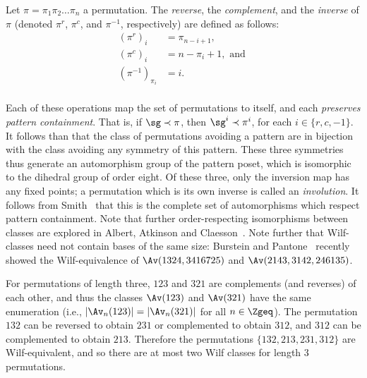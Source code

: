 \documentclass[12pt,twoside]{memoir}
\begin{document}
      \begin{definition} \label{prelim:def:symmetries}
        Let $\pi = \pi_1 \pi_2 \dots \pi_n$ a permutation. The
        \emph{reverse}, the \emph{complement}, and the \emph{inverse} of $\pi$
        (denoted $\pi^r$, $\pi^c$, and $\pi^{-1}$, respectively) are defined as
        follows:
        $$ \begin{aligned}
          \left(\pi^r\right)_i &= \pi_{n-i + 1}, \\
          \left(\pi^c\right)_i &= n - \pi_{i} + 1, \text{ and } \\
          \left(\pi^{-1}\right)_{\pi_i} &= i. \\
        \end{aligned} $$
      \end{definition}
      
      Each of these operations map the set of permutations to itself, and each
      \emph{preserves pattern containment}. That is, if $\sg \prec \pi$, then
      $\sg^i \prec \pi^i$, for each $i \in \{r, c, -1\}$. It follows than that
      the class of permutations avoiding a pattern are in bijection with the
      class avoiding any symmetry of this pattern. These three symmetries
      thus generate an automorphism group of the pattern poset, which is
      isomorphic to the dihedral group of order eight. Of these three, only the
      inversion map has any fixed points; a permutation which is its own inverse
      is called an \emph{involution}.  It follows from Smith~\cite{Smith2006}
      that this is the complete set of automorphisms which respect pattern
      containment. Note that further order-respecting isomorphisms between classes
      are explored in Albert, Atkinson and Claesson~\cite{Claesson2013}. Note
      further that Wilf-classes need not contain bases of the same size: 
      Burstein and Pantone~\cite{pantone2014} recently showed the
      Wilf-equivalence of $\Av(1324, 3416725)$ and 
      $\Av(2143,3142,246135)$. 

      For permutations of length three, $123$ and $321$ are complements (and
      reverses) of each other, and thus the classes $\Av(123)$ and $\Av(321)$ 
      have the same enumeration (i.e., $|\Av_n(123)| = |\Av_n(321)|$ for all $n
      \in \Zgeq$). The permutation $132$ can be reversed to obtain $231$ or
      complemented to obtain $312$, and $312$ can be complemented to obtain
      $213$. Therefore the permutations $\{132, 213, 231, 312\}$ are
      Wilf-equivalent, and so there are at most two Wilf classes for length $3$
      permutations. 
\end{document}
